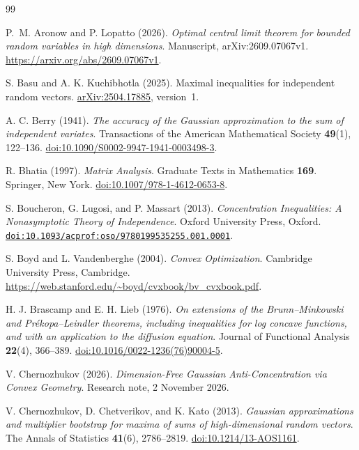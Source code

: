 \documentclass[11pt,letterpaper]{article}
\theoremstyle{remark}
\begin{document}
\begin{thebibliography}{99}
\setlength{\itemsep}{1pt}
{}
P.~M. Aronow and P. Lopatto (2026).
\emph{Optimal central limit theorem for bounded random variables in high dimensions}.
Manuscript, arXiv:2609.07067v1.
\url{https://arxiv.org/abs/2609.07067v1}.

S. Basu and A. K. Kuchibhotla (2025).
Maximal inequalities for independent random vectors.
\href{https://arxiv.org/abs/2504.17885}{arXiv:2504.17885}, version~1.

A. C. Berry (1941).
\emph{The accuracy of the Gaussian approximation to the sum of independent variates}.
Transactions of the American Mathematical Society \textbf{49}(1), 122--136.
\href{https://doi.org/10.1090/S0002-9947-1941-0003498-3}{doi:10.1090/S0002-9947-1941-0003498-3}.

R. Bhatia (1997).
\emph{Matrix Analysis}.
Graduate Texts in Mathematics \textbf{169}. Springer, New York.
\href{https://doi.org/10.1007/978-1-4612-0653-8}{doi:10.1007/978-1-4612-0653-8}.

S. Boucheron, G. Lugosi, and P. Massart (2013).
\emph{Concentration Inequalities: A Nonasymptotic Theory of Independence}.
Oxford University Press, Oxford.
\href{https://doi.org/10.1093/acprof:oso/9780199535255.001.0001}{\nolinkurl{doi:10.1093/acprof:oso/9780199535255.001.0001}}.

S. Boyd and L. Vandenberghe (2004).
\emph{Convex Optimization}.
Cambridge University Press, Cambridge.
\url{https://web.stanford.edu/~boyd/cvxbook/bv_cvxbook.pdf}.

H. J. Brascamp and E. H. Lieb (1976).
\emph{On extensions of the Brunn--Minkowski and Pr\'ekopa--Leindler
theorems, including inequalities for log concave functions, and with
an application to the diffusion equation}.
Journal of Functional Analysis \textbf{22}(4), 366--389.
\href{https://doi.org/10.1016/0022-1236(76)90004-5}{doi:10.1016/0022-1236(76)90004-5}.

V. Chernozhukov (2026).
\emph{Dimension-Free Gaussian Anti-Concentration via Convex Geometry}.
Research note, 2 November 2026.

V. Chernozhukov, D. Chetverikov, and K. Kato (2013).
\emph{Gaussian approximations and multiplier bootstrap for maxima of
sums of high-dimensional random vectors}.
The Annals of Statistics \textbf{41}(6), 2786--2819.
\href{https://doi.org/10.1214/13-AOS1161}{doi:10.1214/13-AOS1161}.


\end{thebibliography}
\end{document}
